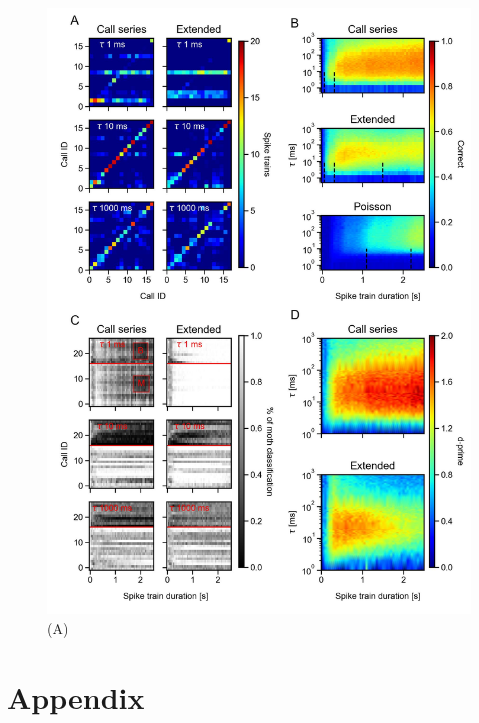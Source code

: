 \documentclass[12pt,a4paper,pdftex]{article}
\begin{document}
\begin{figure}[h!]
	\centering
	\includegraphics{figures/Fig_03.jpeg}
	\caption{\label{fig:03}(A)}
\end{figure}

\FloatBarrier
\newpage
\section*{Appendix}
\end{document}
